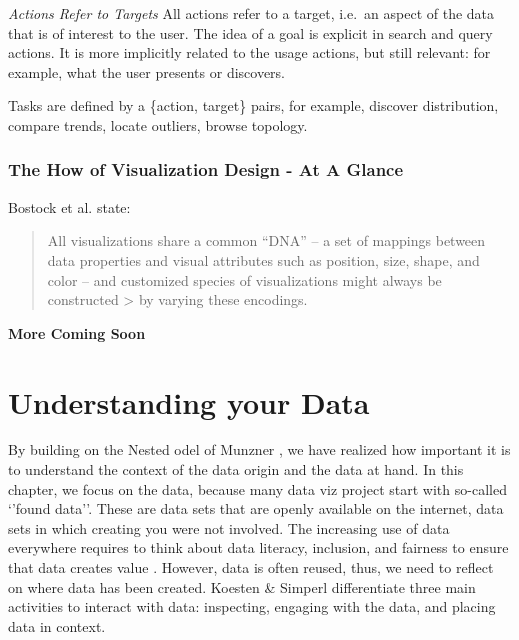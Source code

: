 \documentclass[
]{book}
\begin{document}
\emph{Actions Refer to Targets}
All actions refer to a target, i.e.~an aspect of the data that is of interest to the user. The idea of a goal is explicit in search and query actions. It is more implicitly related to the usage actions, but still relevant: for example, what the user presents or discovers.

Tasks are defined by a \{action, target\} pairs, for example, discover distribution, compare trends, locate outliers, browse topology.

\hypertarget{the-how-of-visualization-design---at-a-glance}{%
\subsection{The How of Visualization Design - At A Glance}\label{the-how-of-visualization-design---at-a-glance}}

Bostock et al. \citep{Heer_Bostock_Ogievetsky_2010} state:

\begin{quote}
All visualizations share a common ``DNA'' -- a set of mappings between data properties and visual attributes
such as position, size, shape, and color -- and customized species of visualizations might always be constructed \textgreater{} by varying these encodings.
\end{quote}

\textbf{More Coming Soon}

\hypertarget{understanding-your-data}{%
\chapter{Understanding your Data}\label{understanding-your-data}}

By building on the Nested odel of Munzner \citep{munzner2014visualization}, we have realized how important it is to understand the context of the data origin and the data at hand. In this chapter, we focus on the data, because many data viz project start with so-called `'found data''. These are data sets that are openly available on the internet, data sets in which creating you were not involved. The increasing use of data everywhere requires to think about data literacy, inclusion, and fairness to ensure that data creates value \citep{KoestenSimperl2021_dataUX}. However, data is often reused, thus, we need to reflect on where data has been created. Koesten \& Simperl \citep{KoestenSimperl2021_dataUX} differentiate three main activities to interact with data: inspecting, engaging with the data, and placing data in context.
\end{document}
